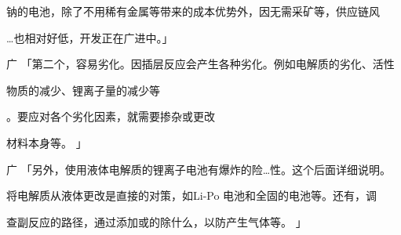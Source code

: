 钠的电池，除了不用稀有金属等带来的成本优势外，因无需采矿等，供应链风\par
…也相对好低，开发正在广进中。」\par
广 「第二个，容易劣化。因插层反应会产生各种劣化。例如电解质的劣化、活性\par
物质的减少、锂离子量的减少等\par
[8]\par
。要应对各个劣化因素，就需要掺杂或更改\par
材料本身等。 」\par
广 「另外，使用液体电解质的锂离子电池有爆炸的险…性。这个后面详细说明。\par
将电解质从液体更改是直接的对策，如Li-Po 电池和全固的电池等。还有，调\par
查副反应的路径，通过添加或的除什么，以防产生气体等。 」\par

